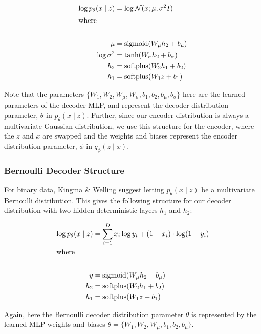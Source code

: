 \documentclass{article} %
\begin{document}
\begin{align*}
    \log p_\theta(x\mid z) &= \log \mathcal{N}(x; \mu, \sigma^2 I)\\
    \intertext{where}\\
    \mu &= \text{sigmoid}(W_\mu h_2 + b_\mu)\\
    \log \sigma^2 &= \text{tanh}(W_\sigma h_2+ b_\sigma)\\
    h_2 &= \text{softplus}(W_{2} h_1 + b_{2})\\
    h_1 &= \text{softplus}(W_{1} z + b_{1})
\end{align*}

Note that the parameters $\{W_1,W_2,W_\mu,W_\sigma,b_1,b_2,b_\mu,b_\sigma\}$ here are the learned parameters of the decoder MLP, and represent the decoder distribution parameter, $\theta$ in $p_\theta(x\mid z)$. Further, since our encoder distribution is always a multivariate Gaussian distribution, we use this structure for the encoder, where the $z$ and $x$ are swapped and the weights and biases represent the encoder distribution parameter, $\phi$ in ${q_\phi(z \mid x)}$.

\subsubsection{Bernoulli Decoder Structure}
For binary data, Kingma \& Welling suggest letting ${p_\theta(x\mid z)}$ be a multivariate Bernoulli distribution. This gives the following structure for our decoder distribution with two hidden deterministic layers $h_1$ and $h_2$:

\begin{align*}
    \log p_\theta(x\mid z) &= \sum_{i=1}^D x_i \log y_i + (1-x_i) \cdot \log (1-y_i)\\
    \intertext{where}\\
    y&=\text{sigmoid}(W_\mu h_2 + b_\mu)\\
    h_2&= \text{softplus}(W_2 h_1 +b_2)\\
    h_1 &= \text{softplus}(W_1 z + b_1)\\
\end{align*}

Again, here the Bernoulli decoder distribution parameter $\theta$ is represented by the learned MLP weights and biases $\theta = \{W_1,W_2,W_\mu,b_1,b_2,b_\mu\}$.
\end{document}
